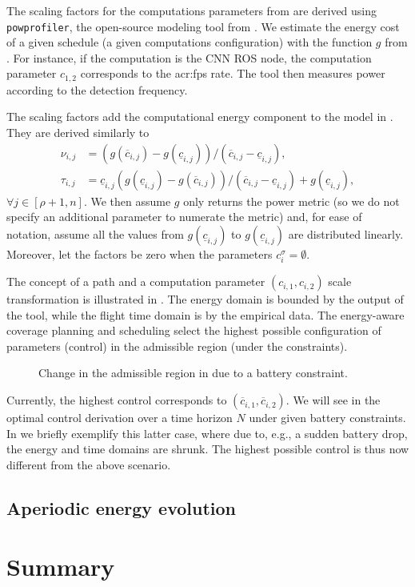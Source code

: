 The scaling factors for the computations parameters from  are derived using {\small\tt{powprofiler}}, the open-source modeling tool from . We estimate the energy cost of a given schedule (a given computations configuration) with the function $g$ from . 
For instance, if the computation is the CNN ROS node, the computation parameter $c_{1,2}$ corresponds to the \Gls{acr:fps} rate. The tool then measures power according to the detection frequency.

The scaling factors add the computational energy component to the model in . They are derived similarly to 
\begin{subequations}\label{eq:scale-comp}\begin{align}
  \nu_{i,j}&=(g(\overline{c}_{i,j})-g(\underline{c}_{i,j}))/(\overline{c}_{i,j}-\underline{c}_{i,j}),\\
  \tau_{i,j}&=\underline{c}_{i,j}(g(\underline{c}_{i,j})-g(\overline{c}_{i,j}))/(\overline{c}_{i,j}-\underline{c}_{i,j})+g(\underline{c}_{i,j}),
\end{align}\end{subequations}
$\forall j\in[\rho+1,n]$. We then assume $g$ only returns the power metric (so we do not specify an additional parameter to numerate the metric) and, for ease of notation, assume all the values from $g(\underline{c}_{i,j})$ to $g(\underline{c}_{i,j})$ are distributed linearly. Moreover, let the factors be zero when the parameters $c_i^\sigma=\emptyset$.

The concept of a path and a computation parameter $(c_{i,1},c_{i,2})$ scale transformation is illustrated in . 
The energy domain is bounded by the output of the \powprof{} tool, while the flight time domain is by the empirical data. The energy-aware coverage planning and scheduling select the highest possible configuration of parameters (control) in the admissible region (under the constraints). 
\begin{figure}[h!]
  \centering
  \selectfont
  
  \caption[Change in the admissible region]{Change in the admissible region in  due to a battery constraint.}
  \label{fig:plot-7}
\end{figure}
Currently, the highest control corresponds to $(\overline{c}_{i,1},\overline{c}_{i,2})$. We will see in  the optimal control derivation over a time horizon $N$ under given battery constraints.
In  we briefly exemplify this latter case, where due to, e.g., a sudden battery drop, the energy and time domains are shrunk. The highest possible control is thus now different from the above scenario.

\subsection{\color{red}Aperiodic energy evolution}
\label{sec:non-perio}


\section{\color{red}Summary}

